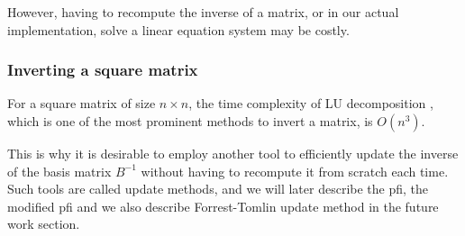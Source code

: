 However, having to recompute the inverse of a matrix, or in our actual
implementation, solve a linear equation system may be costly.

\subsubsection{Inverting a square matrix}
For a square matrix of size \(n \times n\), the time complexity of LU
decomposition
\parencite{golub2013matrix},
which is one of the
most prominent methods to invert a matrix, is $O(n^3) $.

This is why it is desirable to employ another tool to efficiently
update the inverse of the basis matrix $B^{-1}$
without having to recompute it from scratch each time.
Such tools are called update methods,
and we will later describe the \gls{pfi},
the modified \gls{pfi} and we also describe Forrest-Tomlin update method
in the future work section.

